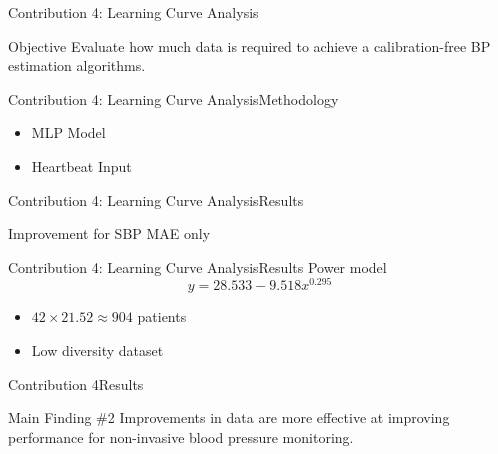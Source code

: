 \begin{frame}{Contribution 4: Learning Curve Analysis}
    \begin{block}{Objective}
        Evaluate how much data is required to achieve a calibration-free BP estimation algorithms.
    \end{block}
\end{frame}

\begin{frame}{Contribution 4: Learning Curve Analysis}{Methodology}
    \begin{figure}
        
    \end{figure}
    \begin{itemize}
        \item MLP Model
        \item Heartbeat Input
    \end{itemize}
\end{frame}

\begin{frame}{Contribution 4: Learning Curve Analysis}{Results}
    \begin{figure}[htbp]
        
        

        
        
    \end{figure}
    Improvement for SBP MAE only
\end{frame}


\begin{frame}{Contribution 4: Learning Curve Analysis}{Results}
    Power model
    \begin{equation}\label{eq:fitted curve}
        y=\num{28.533} - \num{9.518} x^{\num{0.295}}
    \end{equation}
    \begin{figure}[htbp]
        
    \end{figure}

    \pause
    \begin{itemize}
        \item $42 \times 21.52 \approx 904$ patients
        \item Low diversity dataset
    \end{itemize}
\end{frame}

\begin{frame}{Contribution 4}{Results}
    \begin{block}{Main Finding \#2}
        Improvements in data are more effective at improving performance for non-invasive blood pressure monitoring.
    \end{block}
\end{frame}


